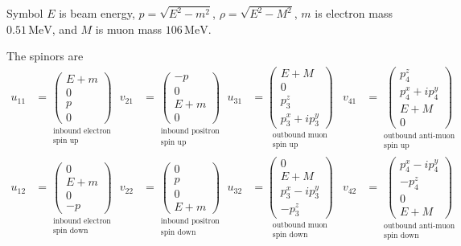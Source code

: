 \documentclass[12pt]{article}
\begin{document}
Symbol $E$ is beam energy, $p=\sqrt{E^2-m^2}$, $\rho=\sqrt{E^2-M^2}$,
$m$ is electron mass $0.51\,\text{MeV}$,
and $M$ is muon mass $106\,\text{MeV}$.

\bigskip
The spinors are
\begin{align*}
u_{11}&=
\underset{\substack{\text{inbound electron}\\\text{spin up}}}
{
\begin{pmatrix}E+m\\0\\p\\0\end{pmatrix}
}
&
v_{21}&=
\underset{\substack{\text{inbound positron}\\\text{spin up}}}
{
\begin{pmatrix}-p\\0\\E+m\\0\end{pmatrix}
}
&
u_{31}&=
\underset{\substack{\text{outbound muon}\\\text{spin up}}}
{
\begin{pmatrix}E+M\\0\\p_3^z\\p_3^x+ip_3^y\end{pmatrix}
}
&
v_{41}&=
\underset{\substack{\text{outbound anti-muon}\\\text{spin up}}}
{
\begin{pmatrix}p_4^z\\p_4^x+ip_4^y\\E+M\\0\end{pmatrix}
}
\\[1ex]
u_{12}&=
\underset{\substack{\text{inbound electron}\\\text{spin down}}}
{
\begin{pmatrix}0\\E+m\\0\\-p\end{pmatrix}
}
&
v_{22}&=
\underset{\substack{\text{inbound positron}\\\text{spin down}}}
{
\begin{pmatrix}0\\p\\0\\E+m\end{pmatrix}
}
&
u_{32}&=
\underset{\substack{\text{outbound muon}\\\text{spin down}}}
{
\begin{pmatrix}0\\E+M\\p_3^x-ip_3^y\\-p_3^z\end{pmatrix}
}
&
v_{42}&=
\underset{\substack{\text{outbound anti-muon}\\\text{spin down}}}
{
\begin{pmatrix}p_4^x-ip_4^y\\-p_4^z\\0\\E+M\end{pmatrix}
}
\end{align*}
\end{document}
